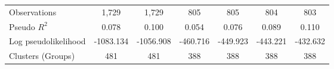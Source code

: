\begin{tabular}{lcccccc}
\midrule
Observations    &    1,729         &    1,729         &      805         &      805         &      804         &      803         \\
Pseudo $R^2$    &    0.078         &    0.100         &    0.054         &    0.076         &    0.089         &    0.110         \\
Log pseudolikelihood&-1083.134         &-1056.908         & -460.716         & -449.923         & -443.221         & -432.632         \\
Clusters (Groups)&      481         &      481         &      388         &      388         &      388         &      388         \\
\bottomrule
\end{tabular}
